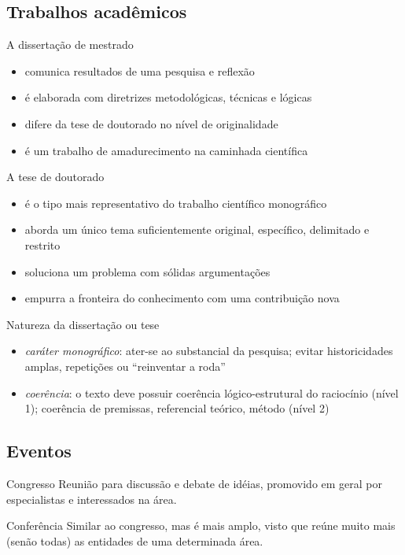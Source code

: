\subsection*{Trabalhos acadêmicos}

\begin{frame}{A dissertação de mestrado}
\begin{itemize}
\item comunica resultados de uma pesquisa e reflexão
\item é elaborada com diretrizes metodológicas, técnicas e lógicas
\item difere da tese de doutorado no nível de originalidade
\item é um trabalho de amadurecimento na caminhada científica
\end{itemize}
\end{frame}

\begin{frame}{A tese de doutorado}
\begin{itemize}
\item é o tipo mais representativo do trabalho científico monográfico
\item aborda um único tema suficientemente original, específico, delimitado e restrito
\item soluciona um problema com sólidas argumentações
\item empurra a fronteira do conhecimento com uma contribuição nova
\end{itemize}
\end{frame}

\begin{frame}{Natureza da dissertação ou tese}
\begin{itemize}
\item \textit{caráter monográfico}: ater-se ao substancial da pesquisa; evitar historicidades amplas, repetições ou ``reinventar a roda''
\item \textit{coerência}: o texto deve possuir coerência lógico-estrutural do raciocínio (nível 1); coerência de premissas, referencial teórico, método (nível 2)
\end{itemize}
\end{frame}

\subsection*{Eventos}

\begin{frame}
\begin{block}{Congresso}
Reunião para discussão e debate de idéias, promovido em geral por especialistas e interessados na área.
\end{block}

\begin{block}{Conferência}
Similar ao congresso, mas é mais amplo, visto que reúne muito mais (senão todas) as entidades de uma determinada área.
\end{block}
\end{frame}

